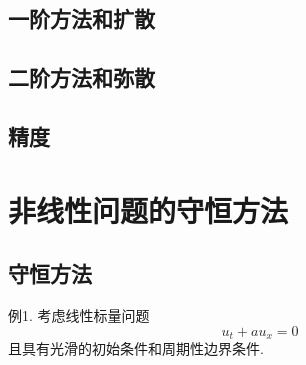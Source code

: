 \subsection{一阶方法和扩散}

\subsection{二阶方法和弥散}

\subsection{精度}

\section{非线性问题的守恒方法}

\subsection{守恒方法}

例1. 考虑线性标量问题 \nocite{Leveque92}
	\begin{equation*}
		u_t + a u_x = 0
	\end{equation*}
	且具有光滑的初始条件和周期性边界条件.